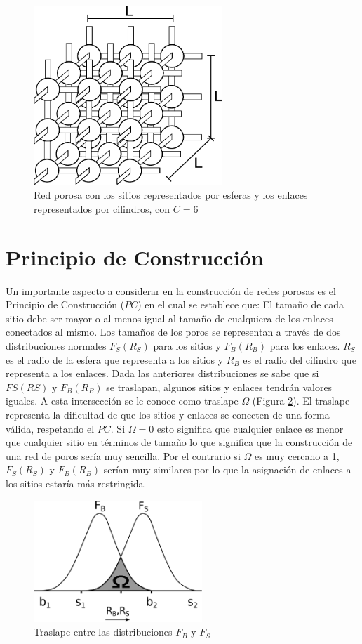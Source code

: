 \begin{figure}[hbtp]
\centering
\includegraphics[width=2.8in]{img/red.pdf}
\caption{Red porosa con los sitios representados por esferas y los enlaces representados por cilindros, con $C=6$}
\label{fig:lattice3d}
\end{figure}
 
\section{Principio de Construcción}
\label{sec:mpc}
Un importante aspecto a considerar en la construcción de redes porosas es el Principio de Construcción ($PC$) en el cual se establece que: El tamaño de cada sitio debe ser mayor o al menos igual al tamaño de cualquiera de los enlaces conectados al mismo. Los tamaños de los poros se representan a través de dos distribuciones normales $F_S(R_S)$ para los sitios y $F_B(R_B)$ para los enlaces. $R_S$ es el radio de la esfera que representa a los sitios y $R_B$ es el radio del cilindro que representa a los enlaces. Dada las anteriores distribuciones se sabe que si $FS(RS)$ y $F_B(R_B)$ se traslapan, algunos sitios y enlaces tendrán valores iguales. A esta intersección se le conoce como traslape $\Omega$ (Figura \ref{fig:overlap}). El traslape representa la dificultad de que los sitios y enlaces se conecten de una forma válida, respetando el $PC$. Si $\Omega=0$ esto significa que cualquier enlace es menor que cualquier sitio en términos de tamaño lo que significa que la construcción de una red de poros sería muy sencilla. Por el contrario si $\Omega$ es muy cercano a 1, $F_S(R_S)$ y $F_B(R_B)$ serían muy similares por lo que la asignación de enlaces a los sitios estaría más restringida.\\

\begin{figure}[hbtp]
\centering
\includegraphics[width=2.5in]{img/traslape.pdf}
\caption{Traslape entre las distribuciones \textit{$F_B$} y $F_S$}
\label{fig:overlap}
\end{figure}

